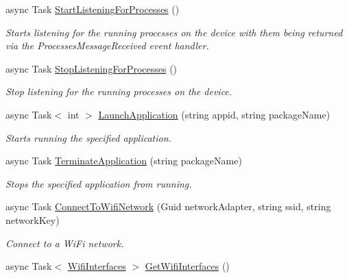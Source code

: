 \begin{DoxyCompactItemize}
async Task \hyperlink{class_microsoft_1_1_tools_1_1_windows_device_portal_1_1_device_portal_a63375403e87407a44a169da84d6c0b25}{Start\+Listening\+For\+Processes} ()
\begin{DoxyCompactList}\small\item\em Starts listening for the running processes on the device with them being returned via the Processes\+Message\+Received event handler. \end{DoxyCompactList}\item 
async Task \hyperlink{class_microsoft_1_1_tools_1_1_windows_device_portal_1_1_device_portal_acc423be400e9661a39bb1990793a3eb5}{Stop\+Listening\+For\+Processes} ()
\begin{DoxyCompactList}\small\item\em Stop listening for the running processes on the device. \end{DoxyCompactList}\item 
async Task$<$ int $>$ \hyperlink{class_microsoft_1_1_tools_1_1_windows_device_portal_1_1_device_portal_a4b6d22e138206f515d22c36d0aa4336b}{Launch\+Application} (string appid, string package\+Name)
\begin{DoxyCompactList}\small\item\em Starts running the specified application. \end{DoxyCompactList}\item 
async Task \hyperlink{class_microsoft_1_1_tools_1_1_windows_device_portal_1_1_device_portal_a550f0491415b41abf3d2c15045f3c1bf}{Terminate\+Application} (string package\+Name)
\begin{DoxyCompactList}\small\item\em Stops the specified application from running. \end{DoxyCompactList}\item 
async Task \hyperlink{class_microsoft_1_1_tools_1_1_windows_device_portal_1_1_device_portal_a4a8b2b014e184bb6efcce720e3f8b932}{Connect\+To\+Wifi\+Network} (Guid network\+Adapter, string ssid, string network\+Key)
\begin{DoxyCompactList}\small\item\em Connect to a Wi\+Fi network. \end{DoxyCompactList}\item 
async Task$<$ \hyperlink{class_microsoft_1_1_tools_1_1_windows_device_portal_1_1_device_portal_1_1_wifi_interfaces}{Wifi\+Interfaces} $>$ \hyperlink{class_microsoft_1_1_tools_1_1_windows_device_portal_1_1_device_portal_a57b1a5c9090485f39fe3088662370922}{Get\+Wifi\+Interfaces} ()

\end{DoxyCompactItemize}
